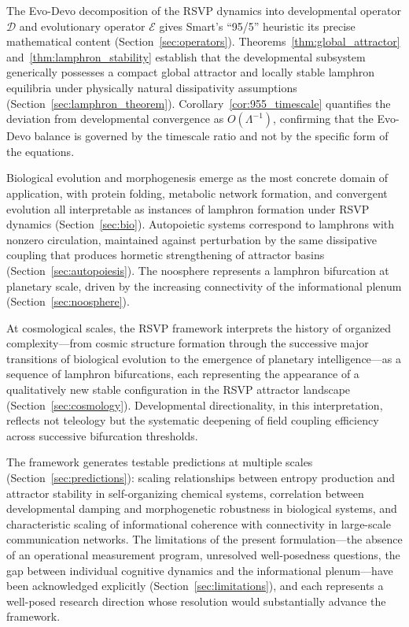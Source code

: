 \documentclass[12pt]{article}
\begin{document}
The Evo-Devo decomposition of the RSVP dynamics into developmental operator $\mathcal{D}$ and evolutionary operator $\mathcal{E}$ gives Smart's ``95/5'' heuristic its precise mathematical content (Section~\ref{sec:operators}). Theorems~\ref{thm:global_attractor} and~\ref{thm:lamphron_stability} establish that the developmental subsystem generically possesses a compact global attractor and locally stable lamphron equilibria under physically natural dissipativity assumptions (Section~\ref{sec:lamphron_theorem}). Corollary~\ref{cor:955_timescale} quantifies the deviation from developmental convergence as $O(\Lambda^{-1})$, confirming that the Evo-Devo balance is governed by the timescale ratio and not by the specific form of the equations.

Biological evolution and morphogenesis emerge as the most concrete domain of application, with protein folding, metabolic network formation, and convergent evolution all interpretable as instances of lamphron formation under RSVP dynamics (Section~\ref{sec:bio}). Autopoietic systems \cite{maturana1980} correspond to lamphrons with nonzero circulation, maintained against perturbation by the same dissipative coupling that produces hormetic strengthening of attractor basins (Section~\ref{sec:autopoiesis}). The noosphere \cite{dechardin1955,smart2023} represents a lamphron bifurcation at planetary scale, driven by the increasing connectivity of the informational plenum (Section~\ref{sec:noosphere}).

At cosmological scales, the RSVP framework interprets the history of organized complexity---from cosmic structure formation through the successive major transitions of biological evolution to the emergence of planetary intelligence---as a sequence of lamphron bifurcations, each representing the appearance of a qualitatively new stable configuration in the RSVP attractor landscape (Section~\ref{sec:cosmology}). Developmental directionality, in this interpretation, reflects not teleology but the systematic deepening of field coupling efficiency across successive bifurcation thresholds.

The framework generates testable predictions at multiple scales (Section~\ref{sec:predictions}): scaling relationships between entropy production and attractor stability in self-organizing chemical systems, correlation between developmental damping and morphogenetic robustness in biological systems, and characteristic scaling of informational coherence with connectivity in large-scale communication networks. The limitations of the present formulation---the absence of an operational measurement program, unresolved well-posedness questions, the gap between individual cognitive dynamics and the informational plenum---have been acknowledged explicitly (Section~\ref{sec:limitations}), and each represents a well-posed research direction whose resolution would substantially advance the framework.
\end{document}
